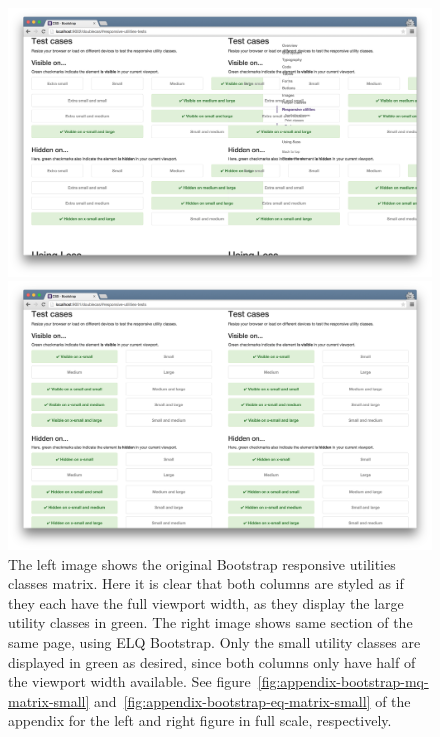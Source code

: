 \documentclass[a4paper,11pt]{kth-mag}
\begin{document}
      \begin{figure}[htb!]
        \centering
        \begin{minipage}{.5\textwidth}
          \centering
          \includegraphics[width=\linewidth]{images/bootstrap-mq-matrix}
        \end{minipage}%
        \begin{minipage}{.5\textwidth}
          \centering
          \includegraphics[width=\linewidth]{images/bootstrap-eq-matrix}
        \end{minipage}
        \caption{
          The left image shows the original \gls{Bootstrap} \gls{responsive} utilities classes matrix.
          Here it is clear that both columns are styled as if they each have the full \gls{viewport} width, as they display the large utility classes in green.
          The right image shows same section of the same page, using \gls{ELQ} \gls{Bootstrap}.
          Only the small utility classes are displayed in green as desired, since both columns only have half of the \gls{viewport} width available.
          See figure~\ref{fig:appendix-bootstrap-mq-matrix-small} and~\ref{fig:appendix-bootstrap-eq-matrix-small} of the appendix for the left and right figure in full scale, respectively.
        }
        \label{fig:eval-bootstrap-mq-eq-matrix}
      \end{figure}
\end{document}
